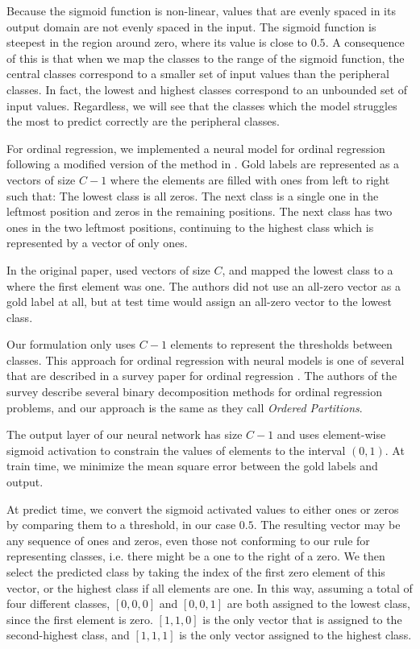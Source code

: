Because the sigmoid function is non-linear, values that are evenly spaced in
its output domain are not evenly spaced in the input. The sigmoid function is
steepest in the region around zero, where its value is close to $0.5$. A
consequence of this is that when we map the classes to the range of the
sigmoid function, the central classes correspond to a smaller set of input
values than the peripheral classes. In fact, the lowest and highest classes
correspond to an unbounded set of input values. Regardless, we will see that
the classes which the model struggles the most to predict correctly are the
peripheral classes.

For ordinal regression, we implemented a neural model for ordinal regression
following a modified version of the method in \textcite{cheng2008neural}.
Gold labels are represented as a vectors of size $C-1$ where the elements are
filled with ones from left to right such that: The lowest class is all zeros.
The next class is a single one in the leftmost position and zeros in the
remaining positions. The next class has two ones in the two leftmost
positions, continuing to the highest class which is represented by a vector
of only ones.

In the original paper, \citeauthor{cheng2008neural} used vectors of size $C$,
and mapped the lowest class to a where the first element was one. The authors
did not use an all-zero vector as a gold label at all, but at test time would
assign an all-zero vector to the lowest class.

Our formulation only uses $C-1$ elements to represent the thresholds between
classes. This approach for ordinal regression with neural models is one of
several that are described in a survey paper for ordinal regression
\autocite{gutierrez2016ordinal}. The authors of the survey describe several
binary decomposition methods for ordinal regression problems, and our
approach is the same as they call \emph{Ordered Partitions}.

The output layer of our neural network has size $C-1$ and uses element-wise
sigmoid activation to constrain the values of elements to the interval
$(0,1)$. At train time, we minimize the mean square error between the gold
labels and output.

At predict time, we convert the sigmoid activated values to either ones or
zeros by comparing them to a threshold, in our case $0.5$. The resulting
vector may be any sequence of ones and zeros, even those not conforming to
our rule for representing classes, i.e. there might be a one to the right of
a zero. We then select the predicted class by taking the index of the first
zero element of this vector, or the highest class if all elements are one. In
this way, assuming a total of four different classes, $[0,0,0]$ and $[0,0,1]$
are both assigned to the lowest class, since the first element is zero.
$[1,1,0]$ is the only vector that is assigned to the second-highest class,
and $[1,1,1]$ is the only vector assigned to the highest class.

